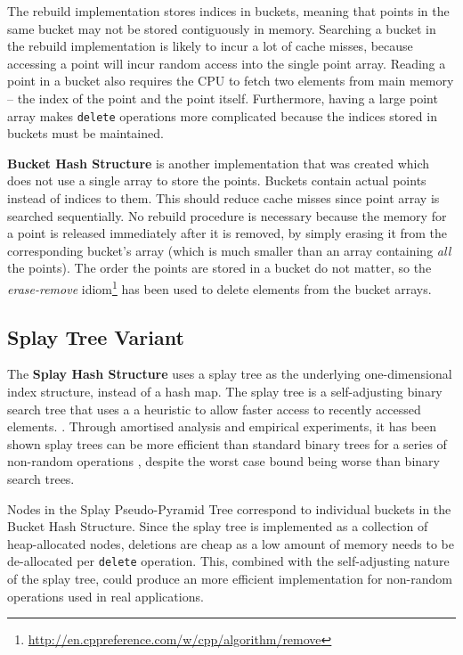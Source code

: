 The rebuild implementation stores indices in buckets, meaning that points in the same bucket may not be stored contiguously in memory. Searching a bucket in the rebuild implementation is likely to incur a lot of cache misses, because accessing a point will incur random access into the single point array. Reading a point in a bucket also requires the CPU to fetch two elements from main memory -- the index of the point and the point itself. Furthermore, having a large point array makes \texttt{delete} operations more complicated because the indices stored in buckets must be maintained.

\textbf{Bucket Hash Structure} is another implementation that was created which does not use a single array to store the points. Buckets contain actual points instead of indices to them. This should reduce cache misses since point array is searched sequentially. No rebuild procedure is necessary because the memory for a point is released immediately after it is removed, by simply erasing it from the corresponding bucket's array (which is much smaller than an array containing \textit{all} the points). The order the points are stored in a bucket do not matter, so the \textit{erase-remove} idiom\footnote{\url{http://en.cppreference.com/w/cpp/algorithm/remove}} has been used to delete elements from the bucket arrays.

\subsection{Splay Tree Variant}

The \textbf{Splay Hash Structure} uses a splay tree as the underlying one-dimensional index structure, instead of a hash map. The splay tree is a self-adjusting binary search tree that uses a a heuristic to allow faster access to recently accessed elements. \cite{splay-tree}. Through amortised analysis and empirical experiments, it has been shown splay trees can be more efficient than standard binary trees for a series of non-random operations \cite{splay-tree}, despite the worst case bound being worse than binary search trees.

Nodes in the Splay Pseudo-Pyramid Tree correspond to individual buckets in the Bucket Hash Structure. Since the splay tree is implemented as a collection of heap-allocated nodes, deletions are cheap as a low amount of memory needs to be de-allocated per \texttt{delete} operation. This, combined with the self-adjusting nature of the splay tree, could produce an more efficient  implementation for non-random operations used in real applications.


